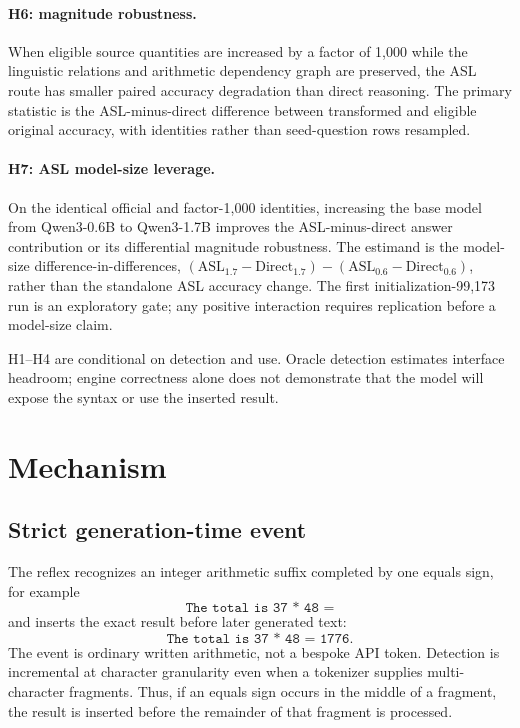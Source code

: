 \documentclass[11pt]{article}
\begin{document}
\paragraph{H6: magnitude robustness.}
When eligible source quantities are increased by a factor of 1,000 while the
linguistic relations and arithmetic dependency graph are preserved, the ASL
route has smaller paired accuracy degradation than direct reasoning. The primary
statistic is the ASL-minus-direct difference between transformed and eligible
original accuracy, with identities rather than seed-question rows resampled.

\paragraph{H7: ASL model-size leverage.}
On the identical official and factor-1,000 identities, increasing the base model
from Qwen3-0.6B to Qwen3-1.7B improves the ASL-minus-direct answer contribution
or its differential magnitude robustness. The estimand is the model-size
difference-in-differences,
$(\mathrm{ASL}_{1.7}-\mathrm{Direct}_{1.7})-
(\mathrm{ASL}_{0.6}-\mathrm{Direct}_{0.6})$, rather than the standalone ASL
accuracy change. The first initialization-99,173 run is an exploratory gate;
any positive interaction requires replication before a model-size claim.

H1--H4 are conditional on detection and use. Oracle detection
estimates interface headroom; engine correctness alone does not demonstrate that
the model will expose the syntax or use the inserted result.

\section{Mechanism}

\subsection{Strict generation-time event}

The reflex recognizes an integer arithmetic suffix completed by one equals sign,
for example
\[
\texttt{The total is 37 * 48 =}
\]
and inserts the exact result before later generated text:
\[
\texttt{The total is 37 * 48 = 1776}.
\]
The event is ordinary written arithmetic, not a bespoke API token. Detection is
incremental at character granularity even when a tokenizer supplies multi-character
fragments. Thus, if an equals sign occurs in the middle of a fragment, the result
is inserted before the remainder of that fragment is processed.
\end{document}

